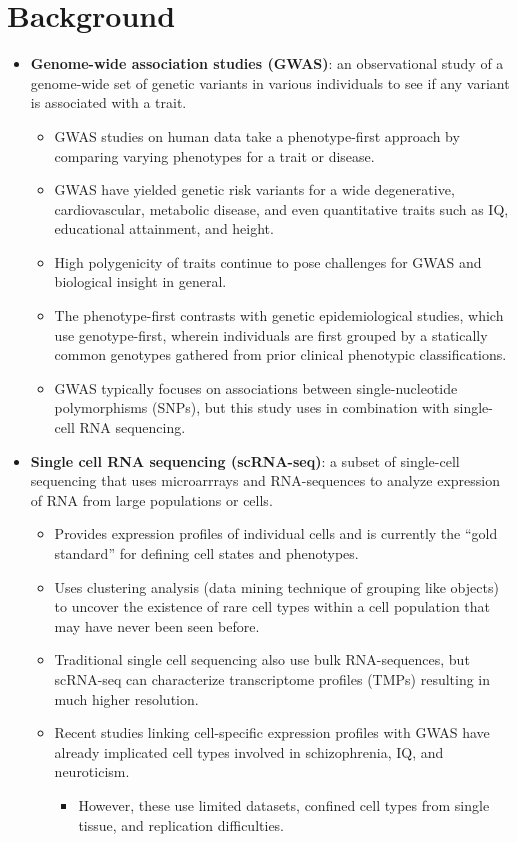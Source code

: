 \documentclass[plain,basic]{inVerba-notes}
\begin{document}
\section{Background}
\begin{itemize}
    \item \textbf{Genome-wide association studies (GWAS)}: an observational study of a genome-wide set of genetic variants in various individuals to see if any variant is associated with a trait.
        \begin{itemize}
            \item GWAS studies on human data take a phenotype-first approach by comparing varying phenotypes for a trait or disease.
            \item GWAS have yielded genetic risk variants for a wide degenerative, cardiovascular, metabolic disease, and even quantitative traits such as IQ, educational attainment, and height.
            \item High polygenicity of traits continue to pose challenges for GWAS and biological insight in general. 
            \item The phenotype-first contrasts with genetic epidemiological studies, which use genotype-first, wherein individuals are first grouped by a statically common genotypes gathered from prior clinical phenotypic classifications.
            \item GWAS typically focuses on associations between single-nucleotide polymorphisms (SNPs), but this study uses in combination with single-cell RNA sequencing.
        \end{itemize}
    \item \textbf{Single cell RNA sequencing (scRNA-seq)}: a subset of single-cell sequencing that uses microarrrays and RNA-sequences to analyze expression of RNA from large populations or cells.
        \begin{itemize}
            \item Provides expression profiles of individual cells and is currently the ``gold standard'' for defining cell states and phenotypes.
            \item Uses clustering analysis (data mining technique of grouping like objects) to uncover the existence of rare cell types within a cell population that may have never been seen before.
            \item Traditional single cell sequencing also use bulk RNA-sequences, but scRNA-seq can characterize transcriptome profiles (TMPs) resulting in much higher resolution. 
            \item Recent studies linking cell-specific expression profiles with GWAS have already implicated cell types involved in schizophrenia, IQ, and neuroticism.
                \begin{itemize}
                    \item However, these use limited datasets, confined cell types from single tissue, and replication difficulties. 
                \end{itemize}
        \end{itemize}
\end{itemize}
\end{document}
